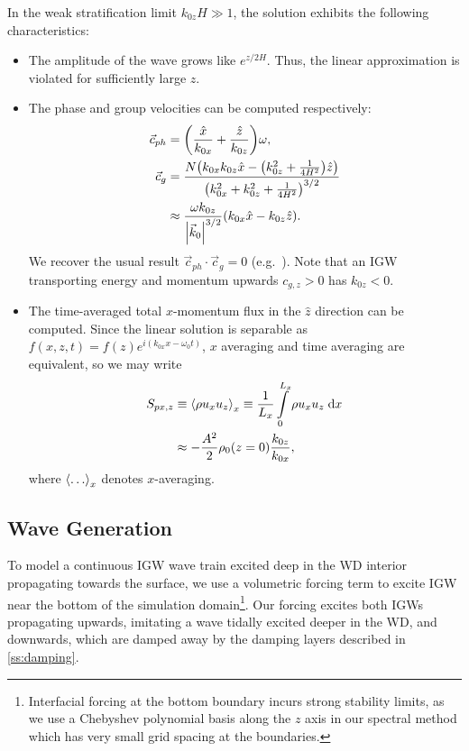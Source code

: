 \documentclass[twocolumn,
        nofootinbib, %
        usenames, %
        aps,
        prd,
        dvipsnames %
    ]{revtex4-1}%
\DeclarePairedDelimiter\abs{\lvert}{\rvert}
\DeclarePairedDelimiter\ev{\langle}{\rangle}
\DeclarePairedDelimiter\p{\lparen}{\rparen}
\begin{document}
In the weak stratification limit $k_{0z}H \gg 1$, the solution exhibits the
following characteristics:
\begin{itemize}
    \item The amplitude of the wave grows like $e^{z/2H}$. Thus, the
        linear approximation is violated for sufficiently large $z$.

    \item The phase and group velocities can be computed respectively:
        \begin{align}
            \vec{c}_{ph} &=
                \p*{\frac{\hat{x}}{k_{0x}} + \frac{\hat{z}}{k_{0z}}}\omega,\\
            \vec{c}_{g} &= \frac{N\p*{k_{0x}k_{0z}\hat{x}
                - \p*{k_{0z}^2 + \frac{1}{4H^2}}\hat{z}}}
                {\p*{k_{0x}^2 + k_{0z}^2 + \frac{1}{4H^2}}^{3/2}} \nonumber\\
                &\approx \frac{\omega k_{0z}}{\abs*{\vec{k}_0}^{3/2}}
                    \p*{k_{0x}\hat{x} - k_{0z}\hat{z}}.
        \end{align}
        We recover the usual result $\vec{c}_{ph} \cdot \vec{c}_g = 0$
        (e.g.\ \cite{drazin,sutherland1}). Note that an IGW transporting energy
        and momentum upwards $c_{g, z} > 0$ has $k_{0z} < 0$.

    \item The time-averaged total $x$-momentum flux in the $\hat{z}$ direction
        can be computed. Since the linear solution is separable as $f(x, z, t) =
        f(z)e^{i(k_{0x}x - \omega_0 t)}$, $x$ averaging and time averaging are
        equivalent, so we may write
        \begin{align}
            S_{px, z} &\equiv \ev*{\rho u_x u_z}_x \equiv
                \frac{1}{L_x}\int_0^{L_x}\limits \rho u_x u_z\;\mathrm{d}x
                    \nonumber\\
                &\approx -\frac{A^2}{2}\rho_0(z=0)\frac{k_{0z}}{k_{0x}},
                    \label{eq:fpx_lin}
        \end{align}
        where $\ev*{\dots}_x$ denotes $x$-averaging.
\end{itemize}

\subsection{Wave Generation}

To model a continuous IGW wave train excited deep in the WD interior propagating
towards the surface, we use a volumetric forcing term to excite IGW near the
bottom of the simulation domain\footnote{Interfacial forcing at the bottom
boundary incurs strong stability limits, as we use a Chebyshev polynomial basis
along the $z$ axis in our spectral method which has very small grid spacing at
the boundaries.}. Our forcing excites both IGWs propagating upwards, imitating a
wave tidally excited deeper in the WD, and downwards, which are damped away by
the damping layers described in \autoref{ss:damping}.
\end{document}
